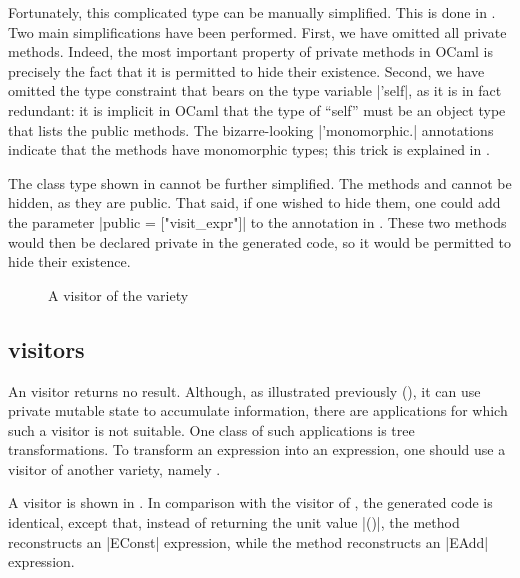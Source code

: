 \documentclass[11pt,a4paper,twoside]{article}
\begin{document}
Fortunately, this complicated type can be manually simplified. This is done in
. Two main simplifications have been performed. First, we
have omitted all private methods. Indeed, the most important property of
private methods in OCaml is precisely the fact that it is permitted to hide
their existence. Second, we have omitted the type constraint that bears on
the type variable \oc|'self|, as it is in fact redundant: it is implicit in OCaml
that the type of ``self'' must be an object type that lists the public methods.
The bizarre-looking \oc|'monomorphic.| annotations indicate that the methods have
monomorphic types; this trick is explained in .

The class type shown in  cannot be further simplified.
The methods  and  cannot be hidden, as
they are public. That said, if one wished to hide them, one could add the parameter %
\oc|public = ["visit_expr"]| to the annotation \derivingvisitors in .
These two methods would then be declared private in the generated code,
so it would be permitted to hide their existence.


\begin{figure}[t]
\vspace{-\baselineskip}
\caption{A visitor of the \map variety}
\label{fig:expr01}
\end{figure}

\subsection{\map visitors}
\label{sec:intro:map}

An \iter visitor returns no result. Although, as illustrated previously
(), it can use private mutable state to accumulate
information, there are applications for which such a visitor is not suitable.
One class of such applications is tree transformations. To transform an
expression into an expression, one should use a visitor of another variety,
namely \map.

A \map visitor is shown in . In comparison with the \iter
visitor of , the generated code is identical, except that,
instead of returning the unit value \oc|()|, the method
 reconstructs an \oc|EConst| expression, while the
method  reconstructs an \oc|EAdd| expression.
\end{document}
